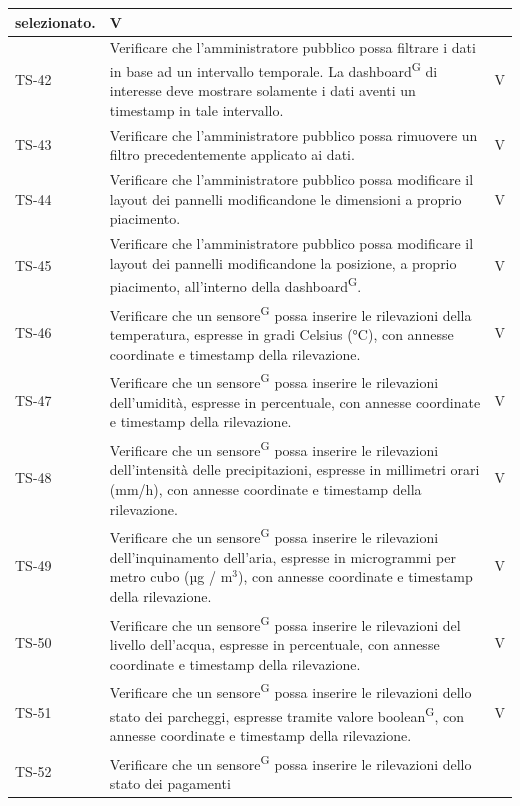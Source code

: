 \documentclass[8pt]{article}
\newcommand{\glossterm}[1]{#1\textsuperscript{G}} %
\begin{document}
\begin{longtable}{|>{\centering}p{2cm}|>{\RaggedRight}m{12cm}|>{\centering\arraybackslash}p{2cm}|}
    selezionato. & V \\
    \hline
    TS-42 & Verificare che l'amministratore pubblico possa filtrare i dati in base ad un intervallo temporale. La \glossterm{dashboard} di interesse deve mostrare solamente i dati aventi un timestamp in tale intervallo.
    & V\\
    \hline
    TS-43 & Verificare che l'amministratore pubblico possa rimuovere un filtro precedentemente applicato ai dati.
    & V\\
    \hline
    TS-44 & Verificare che l'amministratore pubblico possa modificare il layout dei pannelli modificandone le dimensioni a proprio piacimento.
    & V\\
    \hline
    TS-45 & Verificare che l'amministratore pubblico possa modificare il layout dei pannelli modificandone la posizione, a proprio piacimento, all'interno della \glossterm{dashboard}.
    & V\\
    \hline
    TS-46 & Verificare che un \glossterm{sensore} possa inserire le rilevazioni della temperatura, espresse in
    gradi Celsius (°C), con annesse coordinate e timestamp della rilevazione. & V \\
    \hline
    TS-47 & Verificare che un \glossterm{sensore} possa inserire le rilevazioni dell'umidità, espresse in
    percentuale, con annesse coordinate e timestamp della rilevazione. & V \\
    \hline
    TS-48 & Verificare che un \glossterm{sensore} possa inserire le rilevazioni dell'intensità delle precipitazioni, espresse in
    millimetri orari (mm/h), con annesse coordinate e timestamp della rilevazione. & V \\
    \hline
    TS-49 & Verificare che un \glossterm{sensore} possa inserire le rilevazioni dell'inquinamento dell'aria, espresse in
    microgrammi per metro cubo (µg / $\mbox{m}^{\mbox{3}}$), con annesse coordinate e timestamp della rilevazione. & V \\
    \hline
    TS-50 & Verificare che un \glossterm{sensore} possa inserire le rilevazioni del livello dell'acqua, espresse in
    percentuale, con annesse coordinate e timestamp della rilevazione. & V \\
    \hline
    TS-51 & Verificare che un \glossterm{sensore} possa inserire le rilevazioni dello stato dei parcheggi,
    espresse tramite valore \glossterm{boolean}, con annesse coordinate e timestamp della rilevazione. & V \\
    \hline 
    TS-52 & Verificare che un \glossterm{sensore} possa inserire le rilevazioni dello stato dei pagamenti

\end{longtable}
\end{document}
